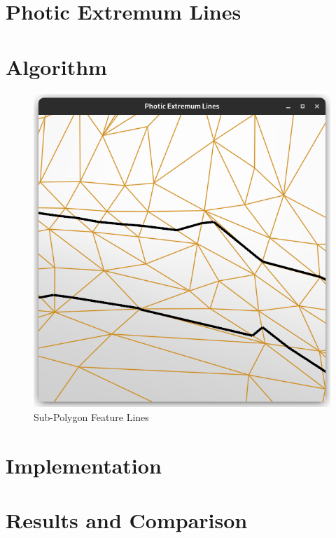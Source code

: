 \documentclass[9pt,fleqn,twoside,twocolumn]{stdglobal}
\begin{document}
\section{Photic Extremum Lines}

\section{Algorithm}

  \begin{figure}
    \centering
    \includegraphics[width=\linewidth,trim={15px 15 15 50},clip]{images/subpolygon-lines.png}
    \caption{Sub-Polygon Feature Lines}
  \end{figure}

\section{Implementation}

\section{Results and Comparison}
\end{document}
